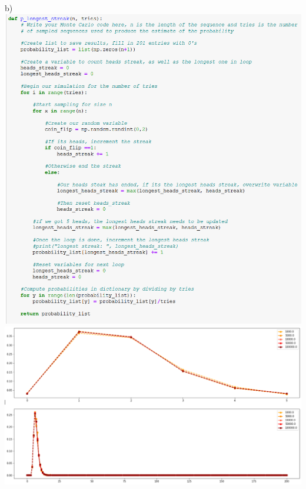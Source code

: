 \documentclass[12pt,twoside]{article}
\begin{document}
 b)\\
\includegraphics[scale=.5]{streaks screenshot.png} \\
 \includegraphics[scale=.5]{graphs for streaks.png}\\   
\end{document}
